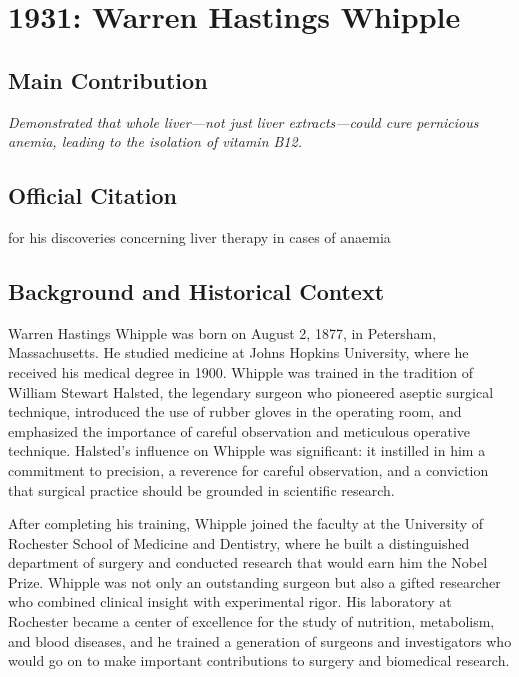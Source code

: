 \chapter[1931 --- Whipple]{1931: Warren Hastings Whipple}
\label{ch:1931_warrenhastingswhipple}

\section*{Main Contribution}

\textit{Demonstrated that whole liver---not just liver extracts---could cure pernicious anemia, leading to the isolation of vitamin B12.}\cite{nobel-1931,lecture-1931}

\section{Official Citation}

for his discoveries concerning liver therapy in cases of anaemia

\section{Background and Historical Context}

Warren Hastings Whipple was born on August 2, 1877, in Petersham, Massachusetts. He studied medicine at Johns Hopkins University, where he received his medical degree in 1900. Whipple was trained in the tradition of William Stewart Halsted, the legendary surgeon who pioneered aseptic surgical technique, introduced the use of rubber gloves in the operating room, and emphasized the importance of careful observation and meticulous operative technique. Halsted's influence on Whipple was significant: it instilled in him a commitment to precision, a reverence for careful observation, and a conviction that surgical practice should be grounded in scientific research.

After completing his training, Whipple joined the faculty at the University of Rochester School of Medicine and Dentistry, where he built a distinguished department of surgery and conducted research that would earn him the Nobel Prize. Whipple was not only an outstanding surgeon but also a gifted researcher who combined clinical insight with experimental rigor. His laboratory at Rochester became a center of excellence for the study of nutrition, metabolism, and blood diseases, and he trained a generation of surgeons and investigators who would go on to make important contributions to surgery and biomedical research.

